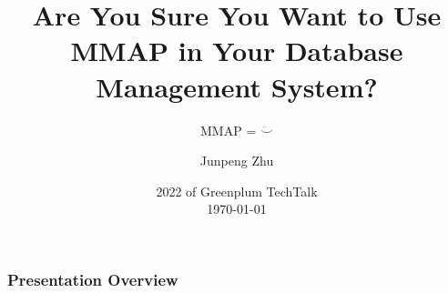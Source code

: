 \documentclass[
	11pt, %
]{beamer}
\title[MMAP = $\ddot\smile$]{Are You Sure You Want to Use MMAP in Your Database Management System?} %
\subtitle{MMAP = $\ddot\smile$} %
\author[Junpeng Zhu]{Junpeng Zhu} %
\institute[VMware, Inc.]{Greenplum, VMware, Inc. \\ \smallskip \textit{zjunpeng@vmware.com}} %
\date[\today]{2022 of Greenplum TechTalk\\ \today} %
\begin{document}

\begin{frame}
	\titlepage %
\end{frame}



\begin{frame}
	\frametitle{Presentation Overview} %
	
	\tableofcontents %
\end{frame}

\end{document}
